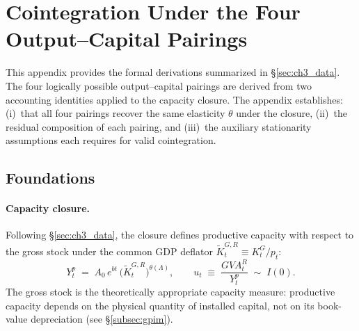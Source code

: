 
\section{Cointegration Under the Four Output--Capital Pairings}
\label{app:four_pairings}

This appendix provides the formal derivations summarized in
\S\ref{sec:ch3_data}. The four logically possible output--capital pairings
are derived from two accounting identities applied to the capacity closure.
The appendix establishes: (i)~that all four pairings recover the same
elasticity $\theta$ under the closure, (ii)~the residual composition of
each pairing, and (iii)~the auxiliary stationarity assumptions each
requires for valid cointegration.


\subsection{Foundations}
\label{app:fp_foundations}

\paragraph{Capacity closure.}
Following \S\ref{sec:ch3_data}, the closure defines productive capacity
with respect to the gross stock under the common GDP deflator
$\tilde{K}_t^{G,R} \equiv K_t^G / p_t$:
%
\begin{equation}
  \label{eq:app_closure}
  Y_t^p \;=\; A_0\,e^{bt}\,\bigl(\tilde{K}_t^{G,R}\bigr)^{\theta(\Lambda)},
  \qquad
  u_t \;\equiv\; \frac{GVA_t^R}{Y_t^p} \;\sim\; I(0).
\end{equation}
%
The gross stock is the theoretically appropriate capacity measure:
productive capacity depends on the physical quantity of installed capital,
not on its book-value depreciation (see \S\ref{subsec:gpim}).

